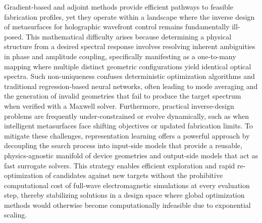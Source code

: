 \documentclass[11pt]{article}
\begin{document}
Gradient-based and adjoint methods provide efficient pathways to feasible fabrication profiles, yet they operate within a landscape where the inverse design of metasurfaces for holographic wavefront control remains fundamentally ill-posed. This mathematical difficulty arises because determining a physical structure from a desired spectral response involves resolving inherent ambiguities in phase and amplitude coupling, specifically manifesting as a one-to-many mapping where multiple distinct geometric configurations yield identical optical spectra. Such non-uniqueness confuses deterministic optimization algorithms and traditional regression-based neural networks, often leading to mode averaging and the generation of invalid geometries that fail to produce the target spectrum when verified with a Maxwell solver. Furthermore, practical inverse-design problems are frequently under-constrained or evolve dynamically, such as when intelligent metasurfaces face shifting objectives or updated fabrication limits. To mitigate these challenges, representation learning offers a powerful approach by decoupling the search process into input-side models that provide a reusable, physics-agnostic manifold of device geometries and output-side models that act as fast surrogate solvers. \citep{doi_10_2139_ssrn_4082312_28ca582d} This strategy enables efficient exploration and rapid re-optimization of candidates against new targets without the prohibitive computational cost of full-wave electromagnetic simulations at every evaluation step, thereby stabilizing solutions in a design space where global optimization methods would otherwise become computationally infeasible due to exponential scaling. \citep{doi_10_71465_fapm546_bda368a5} \citep{doi_10_1002_adom_202502062_d73a85e1}
\end{document}
